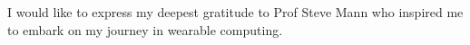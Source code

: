 I would like to express my deepest gratitude to Prof Steve Mann who inspired me to embark on my journey in wearable computing.